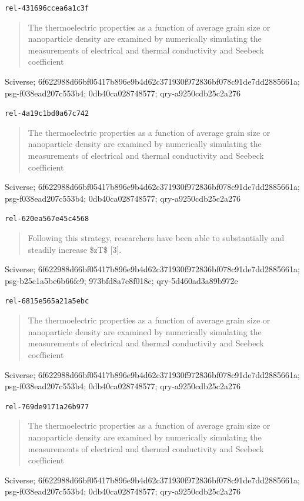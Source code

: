 \documentclass[11pt,a4paper]{article}
\begin{document}
\noindent\texttt{rel-431696ccea6a1c3f} \cite{LimitationsOfZtAsAFigure201962331153}
\begin{quote}The thermoelectric properties as a function of average grain size or nanoparticle density are examined by numerically simulating the measurements of electrical and thermal conductivity and Seebeck coefficient\end{quote}
{\small Sciverse; 6f622988d66bf05417b896e9b4d62c371930f972836bf078c91de7dd2885661a; psg-f038ead207c553b4; 0db40ca028748577; qry-a9250cdb25c2a276}

\noindent\texttt{rel-4a19c1bd0a67c742} \cite{LimitationsOfZtAsAFigure201962331153}
\begin{quote}The thermoelectric properties as a function of average grain size or nanoparticle density are examined by numerically simulating the measurements of electrical and thermal conductivity and Seebeck coefficient\end{quote}
{\small Sciverse; 6f622988d66bf05417b896e9b4d62c371930f972836bf078c91de7dd2885661a; psg-f038ead207c553b4; 0db40ca028748577; qry-a9250cdb25c2a276}

\noindent\texttt{rel-620ea567e45c4568} \cite{LimitationsOfZtAsAFigure201962331153}
\begin{quote}Following this strategy, researchers have been able to substantially and steadily increase \$zT\$ [3].\end{quote}
{\small Sciverse; 6f622988d66bf05417b896e9b4d62c371930f972836bf078c91de7dd2885661a; psg-b25c1a5be6b66fe9; 973bfd8a7e8f018c; qry-5d460ad3a89b972e}

\noindent\texttt{rel-6815e565a21a5ebc} \cite{LimitationsOfZtAsAFigure201962331153}
\begin{quote}The thermoelectric properties as a function of average grain size or nanoparticle density are examined by numerically simulating the measurements of electrical and thermal conductivity and Seebeck coefficient\end{quote}
{\small Sciverse; 6f622988d66bf05417b896e9b4d62c371930f972836bf078c91de7dd2885661a; psg-f038ead207c553b4; 0db40ca028748577; qry-a9250cdb25c2a276}

\noindent\texttt{rel-769de9171a26b977} \cite{LimitationsOfZtAsAFigure201962331153}
\begin{quote}The thermoelectric properties as a function of average grain size or nanoparticle density are examined by numerically simulating the measurements of electrical and thermal conductivity and Seebeck coefficient\end{quote}
{\small Sciverse; 6f622988d66bf05417b896e9b4d62c371930f972836bf078c91de7dd2885661a; psg-f038ead207c553b4; 0db40ca028748577; qry-a9250cdb25c2a276}
\end{document}
